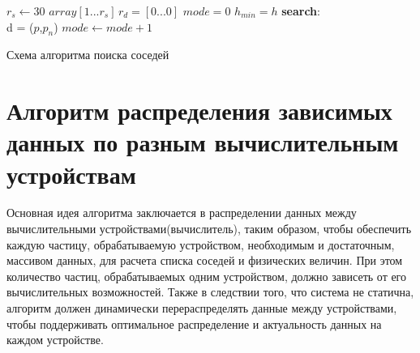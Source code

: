 \begin{algorithm}
\label{algorithm:ns}
\SetAlgoLined
{}
{
    $r_s  \leftarrow 30 $\;
    $array[1...r_s]\, r_d = [0...0]$\;
    $mode = 0$\;
    $h_{min} = h$\;
    \textbf{search}: \\
    {
        {
            d = \Dist($p$,$p_{n}$)\;
        }
        $mode \leftarrow mode + 1$\;
    }
}
\caption{Схема алгоритма поиска соседей}
\end{algorithm}


\section{Алгоритм распределения зависимых данных по разным вычислительным устройствам}\label{sec:ch2/sec3}
Основная идея алгоритма заключается в распределении данных между вычислительными устройствами(вычислитель), таким образом, чтобы обеспечить каждую частицу, обрабатываемую устройством, необходимым и достаточным, массивом данных, для расчета списка соседей и физических величин. При этом количество частиц, обрабатываемых одним устройством, должно зависеть от его вычислительных возможностей. Также в следствии того, что система не статична, алгоритм должен динамически перераспределять данные между устройствами, чтобы поддерживать оптимальное распределение и актуальность данных на каждом устройстве. 

